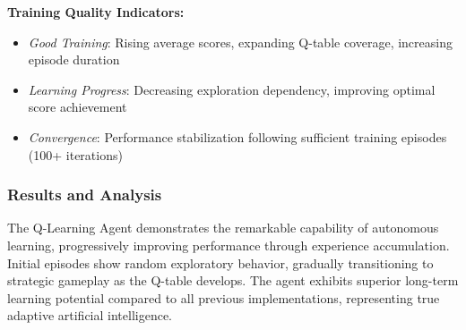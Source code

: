 \documentclass[11pt,a4paper]{article}
\begin{document}
\textbf{Training Quality Indicators:}
\begin{itemize}
\item \textit{Good Training}: Rising average scores, expanding Q-table coverage, increasing episode duration
\item \textit{Learning Progress}: Decreasing exploration dependency, improving optimal score achievement
\item \textit{Convergence}: Performance stabilization following sufficient training episodes (100+ iterations)
\end{itemize}

\subsubsection{Results and Analysis}
The Q-Learning Agent demonstrates the remarkable capability of autonomous learning, progressively improving performance through experience accumulation. Initial episodes show random exploratory behavior, gradually transitioning to strategic gameplay as the Q-table develops. The agent exhibits superior long-term learning potential compared to all previous implementations, representing true adaptive artificial intelligence.
\end{document}
